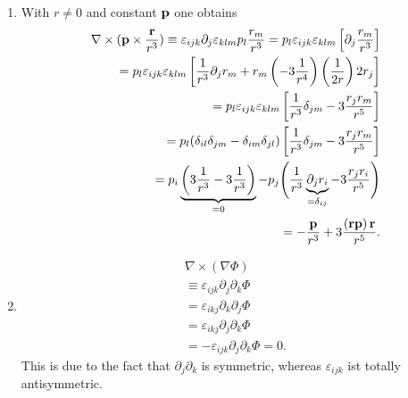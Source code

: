 {\begin{enumerate}
\item    With $r\neq 0$ and constant $\bf p$ one obtains
\begin{equation}
\begin{split}
  \nabla \times ({\bf p} \times \frac{{\bf r}}{r^3})
 \equiv
  \varepsilon_{ijk}\partial_j\varepsilon_{klm}p_l\frac{r_m}{r^3}=
  p_l \varepsilon_{ijk} \varepsilon_{klm}
  \left[\partial_j\frac{r_m}{r^3}\right]  \\
 = p_l
    \varepsilon_{ijk}\varepsilon_{klm}
  \left[
    \frac{1}{r^3}\partial_j r_m + r_m
    \left(-3\frac{1}{r^4}\right)\left(\frac{1}{2r}\right)2r_j
  \right]  \\
  = p_l\varepsilon_{ijk}\varepsilon_{klm}
  \left[
    \frac{1}{r^3}\delta_{jm} - 3\frac{r_j r_m}{r^5}
  \right]  \\
  = p_l(\delta_{il}\delta_{jm}-\delta_{im}\delta_{jl})
  \left[
    \frac{1}{r^3}\delta_{jm} - 3\frac{r_j r_m}{r^5}
  \right]  \\
  = p_i \underbrace{\left(3\frac{1}{r^3}-3\frac{1}{r^3}\right)}_{=0}-
  p_j
  \Biggl({1\over {r^3}}
    \underbrace{{\partial_j r_i}}_{=\delta_{ij}}-
    3\frac{r_j r_i}{r^5}
  \Biggr)  \\
  = -\frac{{\bf p}}{r^3}+3\frac{\left({\bf r} {\bf p}\right){\bf r}}{r^5}
.
\end{split}
\end{equation}



\item
\begin{equation}
\begin{split}
{\nabla} \times({\nabla }\Phi )\\
\equiv
\varepsilon_{ijk} \partial_j \partial_k \Phi \\ =
\varepsilon_{ikj} \partial_k \partial_j \Phi  \\=
\varepsilon_{ikj} \partial_j \partial_k \Phi  \\=
-\varepsilon_{ijk} \partial_j \partial_k \Phi =0.
\end{split}
\end{equation}
This is due to the fact that $\partial_j \partial_k$ is  symmetric, whereas
$\varepsilon_{ijk}$ ist totally antisymmetric.



\end{enumerate}}
